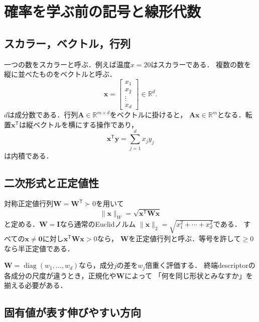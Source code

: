 \documentclass[a4paper,11pt]{ltjsarticle}
\newcommand{\R}{\mathbb R}
\newcommand{\I}{\bm I}
\newcommand{\T}{\mathsf T}
\newcommand{\diag}{\operatorname{diag}}
\begin{document}
\section{確率を学ぶ前の記号と線形代数}
\label{sec:linear-algebra}

\subsection{スカラー，ベクトル，行列}

一つの数をスカラーと呼ぶ．例えば温度\(x=20\)はスカラーである．
複数の数を縦に並べたものをベクトルと呼ぶ．
\begin{equation}
  \bm x=
  \begin{bmatrix}x_1\\x_2\\\vdots\\x_d\end{bmatrix}
  \in\R^d.
\end{equation}
\(d\)は成分数である．行列\(\bm A\in\R^{m\times d}\)をベクトルに掛けると，
\(\bm A\bm x\in\R^m\)となる．転置\(\bm x^\T\)は縦ベクトルを横にする操作であり，
\begin{equation}
  \bm x^\T\bm y=\sum_{j=1}^d x_jy_j
\end{equation}
は内積である．

\subsection{二次形式と正定値性}

対称正定値行列\(\bm W=\bm W^\T\succ0\)を用いて
\begin{equation}
  \|\bm x\|_W
  =\sqrt{\bm x^\T\bm W\bm x}
  \label{eq:w-norm}
\end{equation}
と定める．\(\bm W=\I\)なら通常のEuclidノルム
\(\|\bm x\|_2=\sqrt{x_1^2+\cdots+x_d^2}\)である．
すべての\(\bm x\neq\bm0\)に対し\(\bm x^\T\bm W\bm x>0\)なら，
\(\bm W\)を正定値行列と呼ぶ．等号を許して\(\geq0\)なら半正定値である．

\begin{intuitionbox}[重み付き距離]
\(\bm W=\diag(w_1,\ldots,w_d)\)なら，成分\(j\)の差を\(w_j\)倍重く評価する．
終端descriptorの各成分の尺度が違うとき，正規化や\(\bm W\)によって
「何を同じ形状とみなすか」を揃える必要がある．
\end{intuitionbox}

\subsection{固有値が表す伸びやすい方向}
\end{document}
